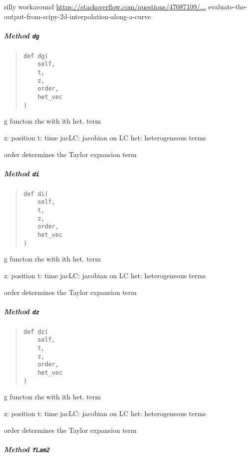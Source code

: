 \documentclass[
  english,
  a4paper,
  oneside]{article}
\begin{document}
silly workaround \url{https://stackoverflow.com/questions/47087109/...}
evaluate-the-output-from-scipy-2d-interpolation-along-a-curve

\hypertarget{StrongCoupling.StrongCoupling.dg}{%
\subparagraph{\texorpdfstring{Method
\texttt{dg}}{Method dg}}\label{StrongCoupling.StrongCoupling.dg}}

\begin{quote}
\begin{verbatim}
def dg(
    self,
    t,
    z,
    order,
    het_vec
)
\end{verbatim}
\end{quote}

g functon rhs with ith het. term

z: position t: time jacLC: jacobian on LC het: heterogeneous terms

order determines the Taylor expansion term

\hypertarget{StrongCoupling.StrongCoupling.di}{%
\subparagraph{\texorpdfstring{Method
\texttt{di}}{Method di}}\label{StrongCoupling.StrongCoupling.di}}

\begin{quote}
\begin{verbatim}
def di(
    self,
    t,
    z,
    order,
    het_vec
)
\end{verbatim}
\end{quote}

g functon rhs with ith het. term

z: position t: time jacLC: jacobian on LC het: heterogeneous terms

order determines the Taylor expansion term

\hypertarget{StrongCoupling.StrongCoupling.dz}{%
\subparagraph{\texorpdfstring{Method
\texttt{dz}}{Method dz}}\label{StrongCoupling.StrongCoupling.dz}}

\begin{quote}
\begin{verbatim}
def dz(
    self,
    t,
    z,
    order,
    het_vec
)
\end{verbatim}
\end{quote}

g functon rhs with ith het. term

z: position t: time jacLC: jacobian on LC het: heterogeneous terms

order determines the Taylor expansion term

\hypertarget{StrongCoupling.StrongCoupling.fLam2}{%
\subparagraph{\texorpdfstring{Method
\texttt{fLam2}}{Method fLam2}}\label{StrongCoupling.StrongCoupling.fLam2}}
\end{document}
